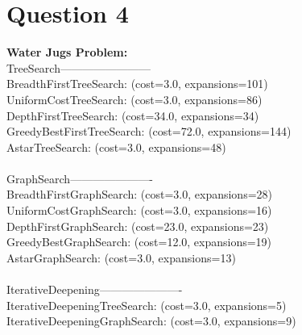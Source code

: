 \documentclass[letterpaper, 12pt]{artikel3}
\begin{document}
\section*{Question 4}
\textbf{Water Jugs Problem:}\\
TreeSearch------------------------\\
BreadthFirstTreeSearch:		(cost=3.0, expansions=101)	\\
UniformCostTreeSearch:		(cost=3.0, expansions=86)	\\
DepthFirstTreeSearch:		(cost=34.0, expansions=34)	\\ 
GreedyBestFirstTreeSearch:	(cost=72.0, expansions=144)	\\
AstarTreeSearch:		(cost=3.0, expansions=48)\\
\\
GraphSearch----------------------\\
BreadthFirstGraphSearch:	(cost=3.0, expansions=28)	\\
UniformCostGraphSearch:		(cost=3.0, expansions=16)	\\
DepthFirstGraphSearch:		(cost=23.0, expansions=23)	\\
GreedyBestGraphSearch:		(cost=12.0, expansions=19)	\\
AstarGraphSearch:		(cost=3.0, expansions=13)	\\
\\
IterativeDeepening----------------------\\
IterativeDeepeningTreeSearch:	(cost=3.0, expansions=5)\\
IterativeDeepeningGraphSearch:	(cost=3.0, expansions=9)	\\
\end{document}

